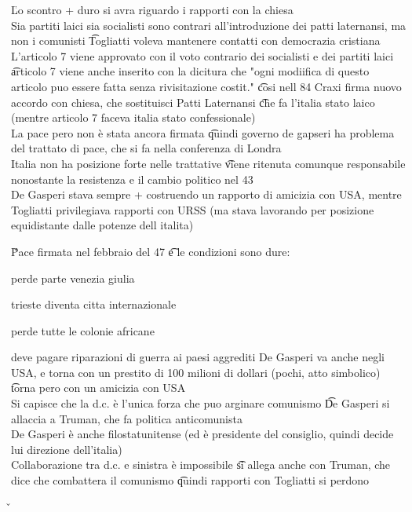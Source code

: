 \documentclass[12pt]{article}
\begin{document}
\v

Lo scontro + duro si avra riguardo i rapporti con la chiesa \\
Sia partiti laici sia socialisti sono contrari all'introduzione dei patti laternansi, ma non i comunisti \t Togliatti voleva mantenere contatti con democrazia cristiana \\
L'articolo 7 viene approvato con il voto contrario dei socialisti e dei partiti laici \t articolo 7 viene anche inserito con la dicitura che "ogni modiifica di questo articolo puo essere fatta senza rivisitazione costit." \t cosi nell 84 Craxi firma nuovo accordo con chiesa, che sostituisci Patti Laternansi \t che fa l'italia stato laico (mentre articolo 7 faceva italia stato confessionale) \\
La pace pero non è stata ancora firmata \t quindi governo de gapseri ha problema del trattato di pace, che si fa nella conferenza di Londra \\
Italia non ha posizione forte nelle trattative \t viene ritenuta comunque responsabile nonostante la resistenza e il cambio politico nel 43 \\
De Gasperi stava sempre + costruendo un rapporto di amicizia con USA, mentre Togliatti privilegiava rapporti con URSS (ma stava lavorando per posizione equidistante dalle potenze dell italita)

\v

Pace firmata nel febbraio del 47 \t e le condizioni sono dure:
\bi
  \item perde parte venezia giulia
  \item trieste diventa citta internazionale
  \item perde tutte le colonie africane
  \item deve pagare riparazioni di guerra ai paesi aggrediti
\ei
De Gasperi va anche negli USA, e torna con un prestito di 100 milioni di dollari (pochi, atto simbolico) \t torna pero con un amicizia con USA \\
Si capisce che la d.c. è l'unica forza che puo arginare comunismo \t De Gasperi si allaccia a Truman, che fa politica anticomunista \\
De Gasperi è anche filostatunitense (ed è presidente del consiglio, quindi decide lui direzione dell'italia) \\
Collaborazione tra d.c. e sinistra è impossibile \t si allega anche con Truman, che dice che combattera il comunismo \t quindi rapporti con Togliatti si perdono

\v
\end{document}
